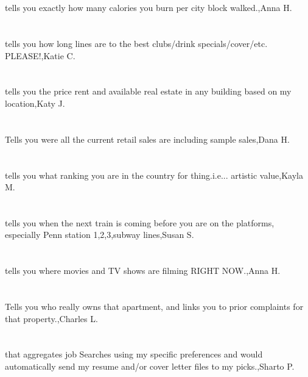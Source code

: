 \section{}tells you exactly how many calories you burn per city block walked.,Anna H.
\section{} tells you how long lines are to the best clubs/drink specials/cover/etc. PLEASE!,Katie C.
\section{}tells you the price rent and available real estate in any building based on my location,Katy J.
\section{}Tells you were all the current retail sales are including sample sales,Dana H.
\section{}tells you what ranking you are in the country for thing.i.e... artistic value,Kayla M.
\section{}tells you when the next train is coming before you are on the platforms, especially Penn station 1,2,3,subway lines,Susan S.
\section{}tells you where movies and TV shows are filming RIGHT NOW.,Anna H.
\section{}Tells you who really owns that apartment, and links you to prior complaints for that property.,Charles L.
\section{}that aggregates job Searches using my specific preferences and would automatically send my resume and/or cover letter files to my picks.,Sharto P.
